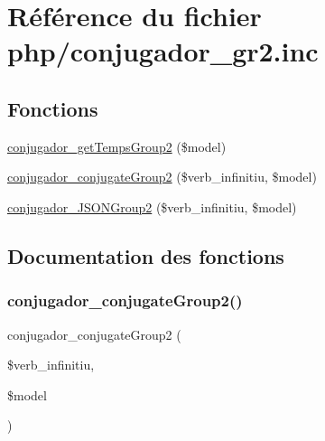 \hypertarget{php_2conjugador__gr2_8inc}{}\section{Référence du fichier php/conjugador\+\_\+gr2.inc}
\label{php_2conjugador__gr2_8inc}
\subsection*{Fonctions}
\begin{DoxyCompactItemize}
\item 
\hyperlink{php_2conjugador__gr2_8inc_a38e47f1d53f3db71b10d94b080e27190}{conjugador\+\_\+get\+Temps\+Group2} (\$model)
\item 
\hyperlink{php_2conjugador__gr2_8inc_a67fdddf161087db219c66ef23e1062e4}{conjugador\+\_\+conjugate\+Group2} (\$verb\+\_\+infinitiu, \$model)
\item 
\hyperlink{php_2conjugador__gr2_8inc_a23811a826aba996459214db8b2176a60}{conjugador\+\_\+\+J\+S\+O\+N\+Group2} (\$verb\+\_\+infinitiu, \$model)
\end{DoxyCompactItemize}


\subsection{Documentation des fonctions}
\hypertarget{php_2conjugador__gr2_8inc_a67fdddf161087db219c66ef23e1062e4}{}\label{php_2conjugador__gr2_8inc_a67fdddf161087db219c66ef23e1062e4} 
\subsubsection{\texorpdfstring{conjugador\+\_\+conjugate\+Group2()}{conjugador\_conjugateGroup2()}}
{\footnotesize\ttfamily conjugador\+\_\+conjugate\+Group2 (\begin{DoxyParamCaption}\item[{}]{\$verb\+\_\+infinitiu,  }\item[{}]{\$model }\end{DoxyParamCaption})}

\hypertarget{php_2conjugador__gr2_8inc_a38e47f1d53f3db71b10d94b080e27190}{}\label{php_2conjugador__gr2_8inc_a38e47f1d53f3db71b10d94b080e27190} 
